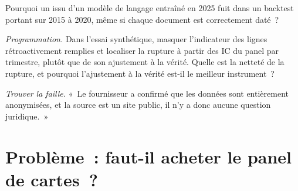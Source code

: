 \begin{exercise}[$\star\star$]\label{exo:rs:alternative-and-text-data:6}
Pourquoi un  issu d'un modèle de langage entraîné en 2025 fuit dans un backtest portant sur 2015 à 2020, même si chaque document est
correctement daté~?
\end{exercise}

\begin{exercise}[$\star\star\star$]\label{exo:rs:alternative-and-text-data:7}
\emph{Programmation.} Dans l'essai synthétique, masquer l'indicateur des lignes rétroactivement remplies et localiser la rupture à partir des IC du panel par trimestre, plutôt que de son ajustement à
la vérité. Quelle est la netteté de la rupture, et pourquoi l'ajustement à la vérité est-il le meilleur instrument~?
\end{exercise}

\begin{exercise}[$\star\star\star$]\label{exo:rs:alternative-and-text-data:8}
\emph{Trouver la faille.} «~Le fournisseur a confirmé que les données sont entièrement anonymisées, et la source est un site public, il n'y a donc aucune question juridique.~»
\end{exercise}

\section{Problème~: faut-il acheter le panel de cartes~?}

